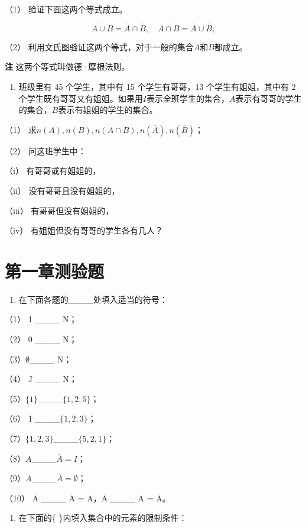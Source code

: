 （1） 验证下面这两个等式成立。

\[
\overline{A \cup B} = \overline{A} \cap \overline{B}, \quad \overline{A \cap B} = \overline{A} \cup \overline{B};
\]

（2） 利用文氏图验证这两个等式，对于一般的集合\(A\)和\(B\)都成立。

\textbf{注} 这两个等式叫做德·摩根法则。

\begin{enumerate}[start=4]
\item
  班级里有 45 个学生，其中有 15 个学生有哥哥，13 个学生有姐姐，其中有 2
  个学生既有哥哥又有姐姐。如果用\(I\)表示全班学生的集合，\(A\)表示有哥哥的学生的集合，\(B\)表示有姐姐的学生的集合。
\end{enumerate}

（1） 求\(n(A), n(B), n(A \cap B), n(\overline{A}), n(\overline{B})\)；

（2） 问这班学生中：

（i） 有哥哥或有姐姐的，

（ii） 没有哥哥且没有姐姐的，

（iii） 有哥哥但没有姐姐的，

（iv） 有姐姐但没有哥哥的学生各有几人？

\section{第一章测验题}

\begin{enumerate}[start=3]
\item
  在下面各题的\_\_\_\_处填入适当的符号：
\end{enumerate}

（1） 1 \_\_\_\_ N；

（2） 0 \_\_\_\_ N；

（3）\(\emptyset\)\_\_\_\_ N；

（4） J \_\_\_\_ N；

（5）\(\{1\}\)\_\_\_\_\(\{1,2,5\}\)；

（6） 1 \_\_\_\_\(\{1,2,3\}\)；

（7）\(\{1,2,3\}\)\_\_\_\_\(\{5,2,1\}\)；

（8）\(A\)\_\_\_\_\(\overline{A}=I\)；

（9）\(A\)\_\_\_\_\(\overline{A}=\emptyset\)；

（10） A \_\_\_\_ A = A，A \_\_\_\_ A = A。

\begin{enumerate}[start=2]
\item
  在下面的\{ \}内填入集合中的元素的限制条件：
\end{enumerate}

